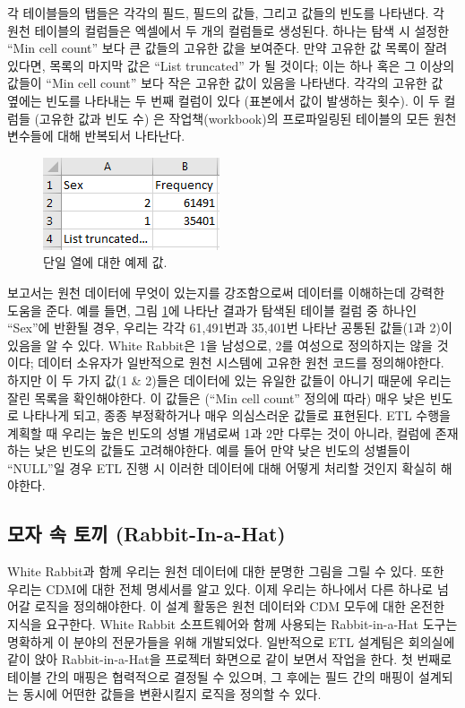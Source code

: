 \documentclass[11pt]{book}
\theoremstyle{definition}
\theoremstyle{definition}
\theoremstyle{definition}
\theoremstyle{remark}
\begin{document}
각 테이블들의 탭들은 각각의 필드, 필드의 값들, 그리고 값들의 빈도를
나타낸다. 각 원천 테이블의 컬럼들은 엑셀에서 두 개의 컬럼들로 생성된다.
하나는 탐색 시 설정한 ``Min cell count'' 보다 큰 값들의 고유한 값을
보여준다. 만약 고유한 값 목록이 잘려있다면, 목록의 마지막 값은 ``List
truncated'' 가 될 것이다; 이는 하나 혹은 그 이상의 값들이 ``Min cell
count'' 보다 작은 고유한 값이 있음을 나타낸다. 각각의 고유한 값 옆에는
빈도를 나타내는 두 번째 컬럼이 있다 (표본에서 값이 발생하는 횟수). 이 두
컬럼들 (고유한 값과 빈도 수) 은 작업책(workbook)의 프로파일링된 테이블의
모든 원천 변수들에 대해 반복되서 나타난다.

\begin{figure}

{\centering \includegraphics[width=0.3\linewidth]{images/ExtractTransformLoad/ScanSex} 

}

\caption{단일 열에 대한 예제 값.}\label{fig:scanSex}
\end{figure}

보고서는 원천 데이터에 무엇이 있는지를 강조함으로써 데이터를 이해하는데
강력한 도움을 준다. 예를 들면, 그림 \ref{fig:scanSex}에 나타난 결과가
탐색된 테이블 컬럼 중 하나인 ``Sex''에 반환될 경우, 우리는 각각
61,491번과 35,401번 나타난 공통된 값들(1과 2)이 있음을 알 수 있다. White
Rabbit은 1을 남성으로, 2를 여성으로 정의하지는 않을 것이다; 데이터
소유자가 일반적으로 원천 시스템에 고유한 원천 코드를 정의해야한다.
하지만 이 두 가지 값(1 \& 2)들은 데이터에 있는 유일한 값들이 아니기
때문에 우리는 잘린 목록을 확인해야한다. 이 값들은 (``Min cell count''
정의에 따라) 매우 낮은 빈도로 나타나게 되고, 종종 부정확하거나 매우
의심스러운 값들로 표현된다. ETL 수행을 계획할 때 우리는 높은 빈도의 성별
개념로써 1과 2만 다루는 것이 아니라, 컬럼에 존재하는 낮은 빈도의 값들도
고려해야한다. 예를 들어 만약 낮은 빈도의 성별들이 ``NULL''일 경우 ETL
진행 시 이러한 데이터에 대해 어떻게 처리할 것인지 확실히 해야한다.

\subsection{모자 속 토끼 (Rabbit-In-a-Hat)}\label{---rabbit-in-a-hat}

White Rabbit과 함께 우리는 원천 데이터에 대한 분명한 그림을 그릴 수
있다. 또한 우리는 CDM에 대한 전체 명세서를 알고 있다. 이제 우리는
하나에서 다른 하나로 넘어갈 로직을 정의해야한다. 이 설계 활동은 원천
데이터와 CDM 모두에 대한 온전한 지식을 요구한다. White Rabbit
소프트웨어와 함께 사용되는 Rabbit-in-a-Hat 도구는 명확하게 이 분야의
전문가들을 위해 개발되었다. 일반적으로 ETL 설계팀은 회의실에 같이 앉아
Rabbit-in-a-Hat을 프로젝터 화면으로 같이 보면서 작업을 한다. 첫 번째로
테이블 간의 매핑은 협력적으로 결정될 수 있으며, 그 후에는 필드 간의
매핑이 설계되는 동시에 어떤한 값들을 변환시킬지 로직을 정의할 수 있다.
 
\end{document}

